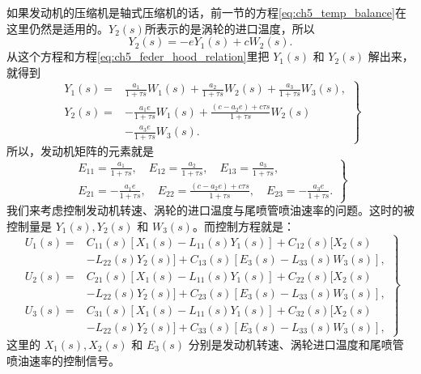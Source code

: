 如果发动机的压缩机是轴式压缩机的话，前一节的方程\eqref{eq:ch5_temp_balance}在这里仍然是适用的。$Y_2(s)$所表示的是涡轮的进口温度，所以
\begin{equation*}
Y_2(s) = -eY_1(s) + cW_2(s).
\end{equation*}
从这个方程和方程\eqref{eq:ch5_feder_hood_relation}里把 $Y_1(s)$ 和 $Y_2(s)$ 解出来，就得到
\begin{equation}\label{eq:ch5_solution_of_feder_hood_relation}
\left.
\begin{array}{ll}
Y_1(s) = & \frac{a_1}{1+\tau s} W_1(s) + \frac{a_2}{1+\tau s} W_2(s) + \frac{a_3}{1+\tau s} W_3(s),\\
Y_2(s) = &-\frac{a_1 e}{1+\tau s} W_1(s) + \frac{(c-a_2 e) + c\tau s}{1+\tau s} W_2(s) \\
		 & - \frac{a_3 e}{1+\tau s} W_3(s).
\end{array}
\right\}
\end{equation}
所以，发动机矩阵的元素就是
\begin{equation}
\left.
\begin{array}{l}
E_{11} = \frac{a_1}{1+\tau s}, \quad E_{12} = \frac{a_2}{1+\tau s}, \quad E_{13} = \frac{a_3}{1+\tau s},\\
E_{21} = -\frac{a_1 e}{1+\tau s}, \quad E_{22} = \frac{(c-a_2 e) + c\tau s}{1+\tau s}, \quad E_{23} = -\frac{a_3 e}{1+\tau s}.
\end{array}
\right\}
\end{equation}
我们来考虑控制发动机转速、涡轮的进口温度与尾喷管喷油速率的问题。这时的被控制量是 $Y_1(s), Y_2(s)$ 和 $W_3(s)$。而控制方程就是：
\begin{equation}
\left.
\begin{array}{ll}
U_1(s) = &  C_{11}(s)[X_1(s) - L_{11}(s)Y_1(s)] + C_{12}(s)[X_2(s)\\
		 &  - L_{22}(s)Y_2(s)] + C_{13}(s)[E_3(s) - L_{33}(s)W_3(s)],\\

U_2(s) = &  C_{21}(s)[X_1(s) - L_{11}(s)Y_1(s)] + C_{22}(s)[X_2(s)\\
		 &  - L_{22}(s)Y_2(s)] + C_{23}(s)[E_3(s) - L_{33}(s)W_3(s)],\\
U_3(s) = &  C_{31}(s)[X_1(s) - L_{11}(s)Y_1(s)] + C_{32}(s)[X_2(s) \\
		 &  - L_{22}(s)Y_2(s)] + C_{33}(s)[E_3(s) - L_{33}(s)W_3(s)],
\end{array}
\right\}
\end{equation}
这里的 $X_1(s), X_2(s)$ 和 $E_3(s)$ 分别是发动机转速、涡轮进口温度和尾喷管喷油速率的控制信号。

